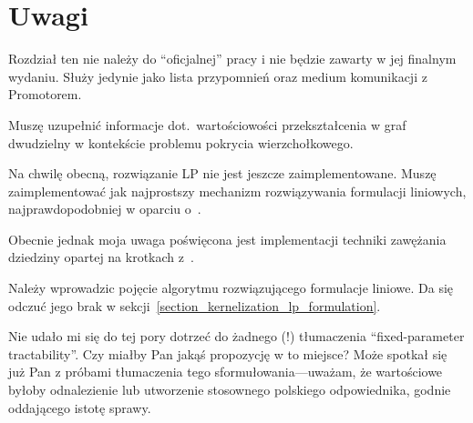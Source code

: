 \chapter{Uwagi}\label{section_notes}

 Rozdział ten nie należy do ``oficjalnej'' pracy i nie będzie zawarty w jej
 finalnym wydaniu.
 Służy jedynie jako lista przypomnień oraz medium komunikacji z Promotorem.

\begin{note}
  Muszę uzupełnić informacje dot.\ wartościowości przekształcenia w graf
  dwudzielny w kontekście problemu pokrycia wierzchołkowego.
\end{note}
\begin{note}
  Na chwilę obecną, rozwiązanie LP nie jest jeszcze zaimplementowane.
  Muszę zaimplementować jak najprostszy mechanizm rozwiązywania formulacji
  liniowych, najprawdopodobniej w oparciu o~\cite{sedgewick11}.


  Obecnie jednak moja uwaga poświęcona jest implementacji techniki zawężania dziedziny
  opartej na krotkach z~\cite{ImprovedBounds10}.
\end{note}
\begin{note}
  Należy wprowadzic pojęcie algorytmu rozwiązującego formulacje liniowe. 
  Da się odczuć jego brak w sekcji~\ref{section_kernelization_lp_formulation}.
\end{note}
\begin{note}
  Nie udało mi się do tej pory dotrzeć do żadnego (!) tłumaczenia
  ``fixed-parameter tractability''.
  Czy miałby Pan jakąś propozycję w to miejsce?
  Może spotkał się już Pan z próbami tłumaczenia tego sformułowania---uważam, że
  wartościowe byłoby odnalezienie lub utworzenie stosownego polskiego
  odpowiednika, godnie oddającego istotę sprawy. 
\end{note}
